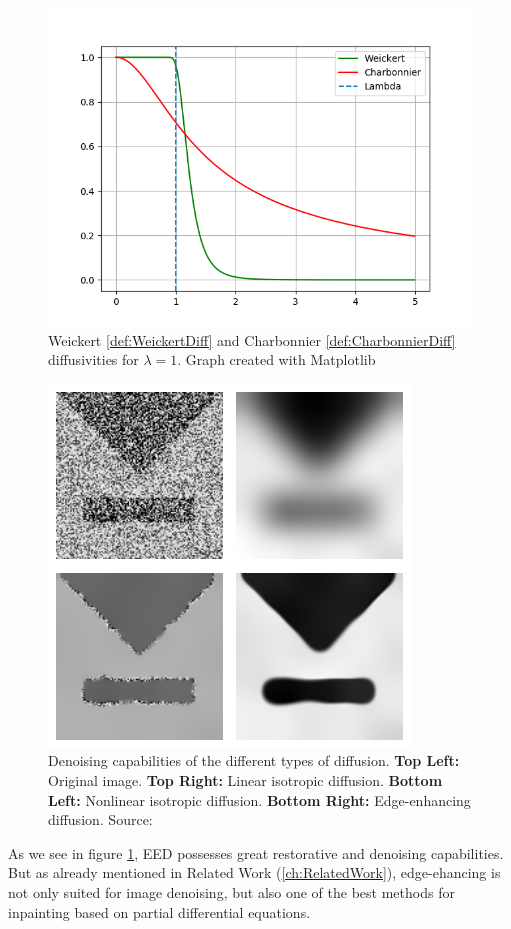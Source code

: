 \begin{figure}[ht]
    \centering
    \includegraphics[width=\linewidth]{../Images/diffusivities.png}
    \caption{Weickert \eqref{def:WeickertDiff} and Charbonnier \eqref{def:CharbonnierDiff} diffusivities for $\lambda = 1$. Graph created with Matplotlib}
\end{figure}
\begin{figure}[ht]
    \centering
    \includegraphics[width=0.8\linewidth]{../Images/diff_examples.png}
    \caption{Denoising capabilities of the different types of diffusion. \textbf{Top Left:} Original
    image. \textbf{Top Right:} Linear isotropic diffusion. \textbf{Bottom Left:} Nonlinear
isotropic diffusion. \textbf{Bottom Right:} Edge-enhancing diffusion. Source:
\cite{weickert96}}\label{fig:DiffExamples}
\end{figure}
As we see in figure \ref{fig:DiffExamples}, EED possesses great restorative and denoising
capabilities. But as already mentioned in Related Work (\ref{ch:RelatedWork}), edge-ehancing is not
only suited for image denoising\cite{galic05}\cite{weickert96}, but also one of the best methods for inpainting based on partial
differential equations\cite{schmaltz09}\cite{galic08}\cite{schmaltz14}.

